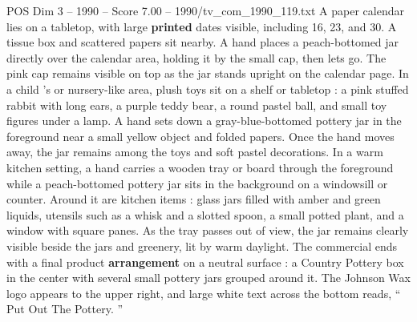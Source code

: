\begin{textsample}{POS Dim 3 – 1990 – Score 7.00 – 1990/tv\_com\_1990\_119.txt}
A paper calendar lies on a tabletop, with large \textbf{printed} dates visible, including 16, 23, and 30.
A tissue box and scattered papers sit nearby.
A hand places a peach-bottomed jar directly over the calendar area, holding it by the small cap, then lets go.
The pink cap remains visible on top as the jar stands upright on the calendar page.
In a child ’s or nursery-like area, plush toys sit on a shelf or tabletop : a pink stuffed rabbit with long ears, a purple teddy bear, a round pastel ball, and small toy figures under a lamp.
A hand sets down a gray-blue-bottomed pottery jar in the foreground near a small yellow object and folded papers.
Once the hand moves away, the jar remains among the toys and soft pastel decorations.
In a warm kitchen setting, a hand carries a wooden tray or board through the foreground while a peach-bottomed pottery jar sits in the background on a windowsill or counter.
Around it are kitchen items : glass jars filled with amber and green liquids, utensils such as a whisk and a slotted spoon, a small potted plant, and a window with square panes.
As the tray passes out of view, the jar remains clearly visible beside the jars and greenery, lit by warm daylight.
The commercial ends with a final product \textbf{arrangement} on a neutral surface : a Country Pottery box in the center with several small pottery jars grouped around it.
The Johnson Wax logo appears to the upper right, and large white text across the bottom reads, “ Put Out The Pottery. ”

\end{textsample}
